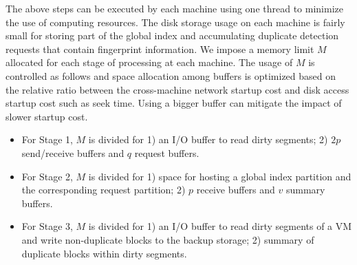 The above steps can be executed by each machine using one thread to minimize
the use of computing resources.
The  disk storage usage on each machine 
is fairly small for  storing part of the global index and
accumulating  duplicate detection requests that contain fingerprint information.   
We impose a memory limit $M$ allocated for each stage of processing at each machine.
The usage of $M$ is controlled as follows and space allocation among buffers is optimized based on the relative
ratio between the cross-machine network  startup cost and disk access startup cost such as seek time.
Using a bigger buffer  can mitigate the impact of slower startup cost. 
\begin{itemize}
\item For Stage 1, $M$  is divided for 
1) an I/O buffer to read dirty segments; 2) $2p$ send/receive buffers and $q$ request  buffers.

\item 
For Stage 2,  $M$  is divided for 1) space for hosting a global index partition and 
the corresponding request partition; 2) $p$ receive buffers and $v$ summary buffers.

\item For Stage 3, $M$  is divided for 1) an I/O buffer to read dirty segments of a VM and   
write non-duplicate blocks to the  backup storage;
2) summary of duplicate blocks within dirty segments. 
\end{itemize}

